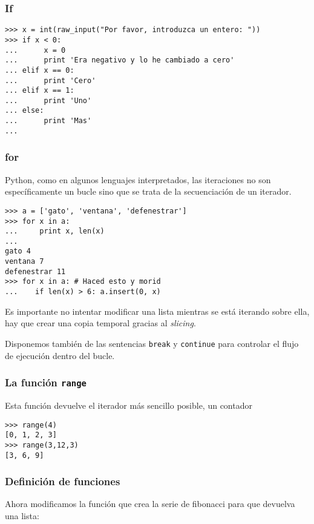 \documentclass[a4paper,10pt]{article}
\begin{document}
\subsubsection{If}

\begin{lstlisting}
>>> x = int(raw_input("Por favor, introduzca un entero: "))
>>> if x < 0:
...      x = 0
...      print 'Era negativo y lo he cambiado a cero'
... elif x == 0:
...      print 'Cero'
... elif x == 1:
...      print 'Uno'
... else:
...      print 'Mas'
...
\end{lstlisting}

\subsubsection{for}

Python, como en algunos lenguajes interpretados, las iteraciones no
son específicamente un bucle sino que se trata de la secuenciación de
un iterador.

\begin{lstlisting}
>>> a = ['gato', 'ventana', 'defenestrar']
>>> for x in a:
...     print x, len(x)
... 
gato 4
ventana 7
defenestrar 11
>>> for x in a: # Haced esto y morid
...    if len(x) > 6: a.insert(0, x)
\end{lstlisting}

Es importante no intentar modificar una lista mientras se está
iterando sobre ella, hay que crear una copia temporal gracias al
\emph{slicing}.

Disponemos también de las sentencias \texttt{break} y
\texttt{continue} para controlar el flujo de ejecución dentro del
bucle.

\subsubsection{La función \texttt{range}}

Esta función devuelve el iterador más sencillo posible, un contador

\begin{lstlisting}
>>> range(4)
[0, 1, 2, 3]
>>> range(3,12,3)
[3, 6, 9]
\end{lstlisting}

\subsubsection{Definición de funciones}

Ahora modificamos la función que crea la serie de fibonacci para que
devuelva una lista:
\end{document}
